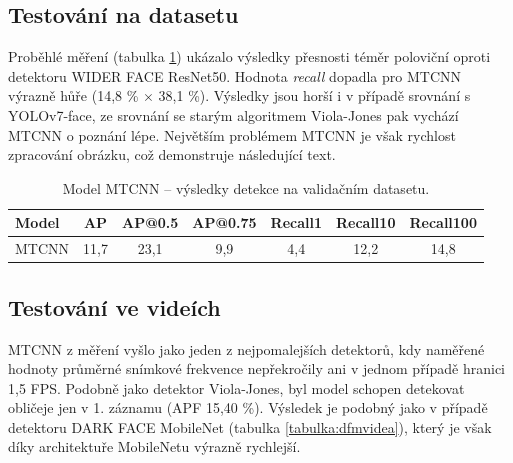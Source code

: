 \subsection*{Testování na datasetu}
Proběhlé měření (tabulka \ref{tabulka:mtcnn}) ukázalo výsledky přesnosti téměr poloviční oproti detektoru WIDER FACE ResNet50. Hodnota \emph{recall} dopadla pro MTCNN výrazně hůře (14,8 \% $\times$ 38,1 \%). Výsledky jsou horší i v případě srovnání s YOLOv7-face, ze srovnání se starým algoritmem Viola-Jones pak vychází MTCNN o poznání lépe. Největším problémem MTCNN je však rychlost zpracování obrázku, což demonstruje následující text.

\begin{table}[H]
  \begin{center}
    \begin{tabular}{|l|c|c|c|c|c|c|}
    \hline
    \rowcolor[HTML]{E0DBDB} 
    \textbf{Model}                & \textbf{AP} & \textbf{AP@0.5} & \textbf{AP@0.75} & \textbf{Recall1} & \textbf{Recall10} & \textbf{Recall100} \\ \hline
    \cellcolor[HTML]{E0DBDB}MTCNN & 11,7        & 23,1            & 9,9              & 4,4              & 12,2              & 14,8               \\ \hline
    \end{tabular}
    \label{tabulka:mtcnn}
    \caption{Model MTCNN -- výsledky detekce na validačním datasetu.}
  \end{center}
\end{table}

\subsection*{Testování ve videích}
MTCNN z měření vyšlo jako jeden z nejpomalejších detektorů, kdy naměřené hodnoty průměrné snímkové frekvence nepřekročily ani v jednom případě hranici 1,5 FPS. Podobně jako detektor Viola-Jones, byl model schopen detekovat obličeje jen v 1. záznamu (APF 15,40 \%). Výsledek je podobný jako v případě detektoru DARK FACE MobileNet (tabulka \ref{tabulka:dfmvidea}), který je však díky architektuře MobileNetu výrazně rychlejší.

